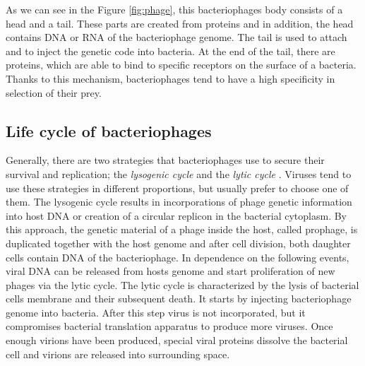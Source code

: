 As we can see in the Figure \ref{fig:phage}, this bacteriophages body consists of a head and a tail.
These parts are created from proteins and in addition, the head contains DNA or RNA of the bacteriophage genome.
The tail is used to attach and to inject the genetic code into bacteria.
At the end of the tail, there are proteins, which are able to bind to specific receptors on the surface of a bacteria.
Thanks to this mechanism, bacteriophages tend to have a high specificity in selection of their prey.

\subsection{Life cycle of bacteriophages}
Generally, there are two strategies that bacteriophages use to secure their survival and replication; the \emph{lysogenic cycle} and the \emph{lytic cycle} \cite{cycles}.
Viruses tend to use these strategies in different proportions, but usually prefer to choose one of them.
The lysogenic cycle results in incorporations of phage genetic information into host DNA or creation of a circular replicon in the bacterial cytoplasm.
By this approach, the genetic material of a phage inside the host, called prophage, is duplicated together with the host genome and after cell division, both daughter cells contain DNA of the bacteriophage.
In dependence on the following events, viral DNA can be released from hosts genome and start proliferation of new phages via the lytic cycle.
The lytic cycle is characterized by the lysis of bacterial cells membrane and their subsequent death.
It starts by injecting bacteriophage genome into bacteria.
After this step virus is not incorporated, but it compromises bacterial translation apparatus to produce more viruses.
Once enough virions have been produced, special viral proteins dissolve the bacterial cell and virions are released into surrounding space.

